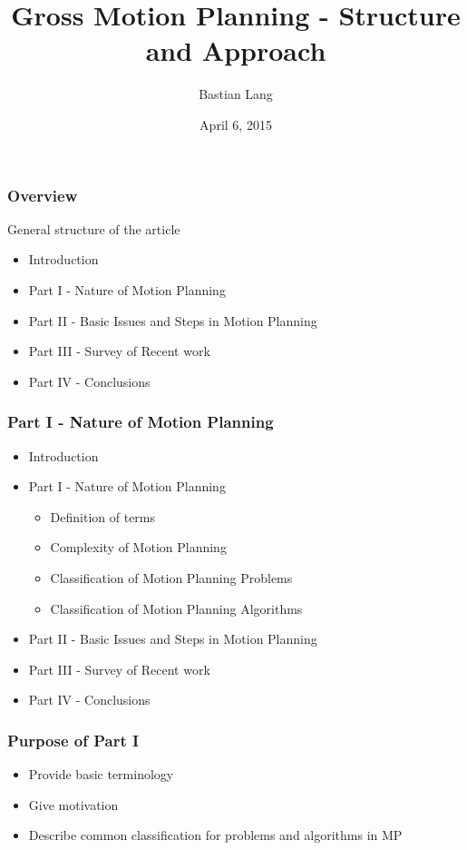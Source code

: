 \documentclass[8pt]{beamer}
\title[Gross Motion Planning]{Gross Motion Planning - Structure and Approach} %
\author{Bastian Lang} %
\institute[BRSU] %
{
Master of Autonomous Systems \\ %
}
\date{April 6, 2015}
\begin{document}
\listoffigures
\begin{frame}
\titlepage 
\end{frame}


\begin{frame}
\frametitle{Overview}
General structure of the article
\begin{itemize}
\item Introduction
\item Part I - Nature of Motion Planning
\item Part II - Basic Issues and Steps in Motion Planning
\item Part III - Survey of Recent work
\item Part IV - Conclusions
\end{itemize}
\end{frame}

\begin{frame}
\frametitle{Part I - Nature of Motion Planning}
\begin{itemize}
\item Introduction
\item Part I - Nature of Motion Planning
\begin{itemize}
\item Definition of terms
\item Complexity of Motion Planning
\item Classification of Motion Planning Problems
\item Classification of Motion Planning Algorithms
\end{itemize}
\item Part II - Basic Issues and Steps in Motion Planning
\item Part III - Survey of Recent work
\item Part IV - Conclusions
\end{itemize}
\end{frame}

\begin{frame}
\frametitle{Purpose of Part I}
\begin{itemize}
\item Provide basic terminology
\item Give motivation
\item Describe common classification for problems and algorithms in MP
\end{itemize}
\end{frame}
\end{document}
